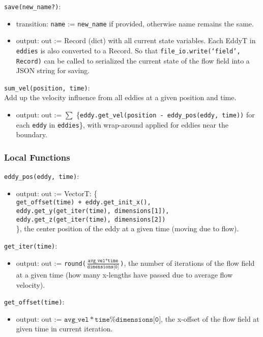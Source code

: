 \documentclass[12pt, titlepage]{article}
\begin{document}
\noindent \texttt{save(new\_name?)}:
\begin{itemize}
  \item transition: \texttt{name} := \texttt{new\_name} if provided, otherwise name remains the same.
  \item output: out := Record (dict) with all current state variables. Each EddyT in \texttt{eddies} is also converted to a Record. So that \texttt{file\_io.write(`field', Record)} can be called to serialized the current state of the flow field into a JSON string for saving.
\end{itemize}

\noindent \texttt{sum\_vel(position, time)}:\\
Add up the velocity influence from all eddies at a given position and time.
\begin{itemize}
  \item output: out := $\sum$ \{\texttt{eddy.get\_vel(position - eddy\_pos(eddy, time))} for each \texttt{eddy} in \texttt{eddies}\}, with wrap-around applied for eddies near the boundary.
\end{itemize}

\subsubsection{Local Functions}


\noindent \texttt{eddy\_pos(eddy, time)}:
\begin{itemize}
\item output: out := VectorT: \{\texttt{\\
  get\_offset(time) + eddy.get\_init\_x(),\\
  eddy.get\_y(get\_iter(time), dimensions[1]),\\
  eddy.get\_z(get\_iter(time), dimensions[2])}\\
\}, the center position of the eddy at a given time (moving due to flow).
\end{itemize}

\noindent \texttt{get\_iter(time)}:
\begin{itemize}
\item output: out := \texttt{round($\frac{\texttt{avg\_vel}*\texttt{time}}{\texttt{dimensions[0]}}$)}, the number of iterations of the flow field at a given time (how many x-lengths have passed due to average flow velocity).
\end{itemize}

\noindent \texttt{get\_offset(time)}:
\begin{itemize}
\item output: out := $\texttt{avg\_vel}*\texttt{time} \% \texttt{dimensions[0]}$, the x-offset of the flow field at given time in current iteration.
\end{itemize}
\end{document}
